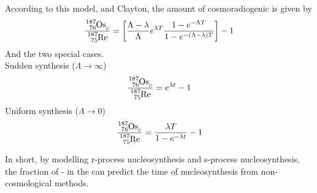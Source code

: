 According to this model, and Clayton, the amount of cosmoradiogenic  is given by
\begin{equation}
  \frac{\os{187}_c}{\re{187}} = \left[
    \frac{\Lambda-\lambda}{\Lambda}
    e^{\lambda T}
    \frac{1-e^{-\Lambda T}}{1-e^{-(\Lambda-\lambda) T}}
    \right] - 1
\end{equation}
And the two special cases. \\
Sudden synthesis ($\Lambda\rightarrow\infty$)
\begin{equation}
  \frac{\os{187}_c}{\re{187}} = e^{\lambda t} - 1
\end{equation}
Uniform synthesis ($\Lambda\rightarrow 0$)
\begin{equation}
  \frac{\os{187}_c}{\re{187}} = \frac{\lambda T}{1-e^{-\lambda t}} - 1
\end{equation}


In short, by modelling r-process nucleosynthesis and s-process nucleosynthesis, the fraction of - in the \sos can predict the time of nucleosynthesis from non-cosmological methods.
\fi
